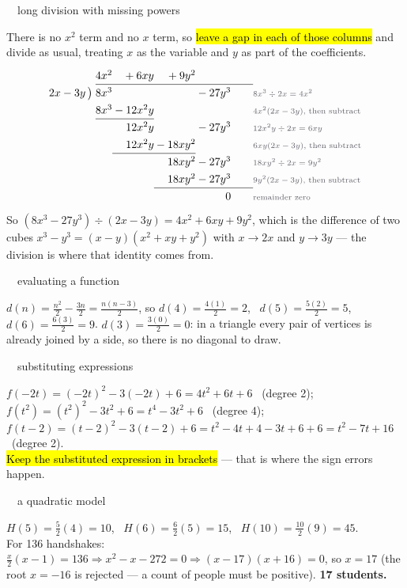 \documentclass[11pt]{article}
\newcommand{\key}[1]{\hl{#1}}
\newcommand{\solhead}[2]{\medskip{\color{lilacdeep}\bfseries Q#1.}\ \ {\color{greyish}\footnotesize #2}\par\nobreak}
\newcommand{\dstep}[1]{\text{\normalfont\scriptsize\color{greyish}#1}}
\begin{document}
\solhead{5}{long division with missing powers}
There is no $x^{2}$ term and no $x$ term, so \key{leave a gap in each of those columns} and divide as usual, treating $x$ as the variable and $y$ as part of the coefficients.
\[\renewcommand{\arraystretch}{1.3}\setlength{\arraycolsep}{0.17em}
\begin{array}{r@{\;}r@{}r@{}r@{}r@{\qquad}l}
              & 4x^{2} & {}+6xy      & {}+9y^{2}   &            & \\ \cline{2-5}
 2x-3y\,\big) & 8x^{3} &             &             & {}-27y^{3} & \dstep{$8x^{3}\div 2x=4x^{2}$}\\
              & 8x^{3} & {}-12x^{2}y &             &            & \dstep{$4x^{2}(2x-3y)$, then subtract}\\ \cline{2-3}
              &        & 12x^{2}y    &             & {}-27y^{3} & \dstep{$12x^{2}y\div 2x=6xy$}\\
              &        & 12x^{2}y    & {}-18xy^{2} &            & \dstep{$6xy(2x-3y)$, then subtract}\\ \cline{3-4}
              &        &             & 18xy^{2}    & {}-27y^{3} & \dstep{$18xy^{2}\div 2x=9y^{2}$}\\
              &        &             & 18xy^{2}    & {}-27y^{3} & \dstep{$9y^{2}(2x-3y)$, then subtract}\\ \cline{4-5}
              &        &             &             & 0          & \dstep{remainder zero}
\end{array}\]
So $(8x^{3}-27y^{3})\div(2x-3y)=4x^{2}+6xy+9y^{2}$, which is the difference of two cubes
$x^{3}-y^{3}=(x-y)(x^{2}+xy+y^{2})$ with $x\to2x$ and $y\to3y$ --- the division is where that identity comes from.

\solhead{6}{evaluating a function}
$d(n)=\frac{n^{2}}{2}-\frac{3n}{2}=\frac{n(n-3)}{2}$, so
$d(4)=\frac{4(1)}{2}=2$, \ $d(5)=\frac{5(2)}{2}=5$, \ $d(6)=\frac{6(3)}{2}=9$.
$d(3)=\frac{3(0)}{2}=0$: in a triangle every pair of vertices is already joined by a side, so there is no diagonal to draw.

\solhead{7}{substituting expressions}
$f(-2t)=(-2t)^{2}-3(-2t)+6=4t^{2}+6t+6$ \ (degree 2);\\
$f(t^{2})=(t^{2})^{2}-3t^{2}+6=t^{4}-3t^{2}+6$ \ (degree 4);\\
$f(t-2)=(t-2)^{2}-3(t-2)+6=t^{2}-4t+4-3t+6+6=t^{2}-7t+16$ \ (degree 2).\\
\key{Keep the substituted expression in brackets} --- that is where the sign errors happen.

\solhead{8}{a quadratic model}
$H(5)=\frac52(4)=10$, \ $H(6)=\frac62(5)=15$, \ $H(10)=\frac{10}{2}(9)=45$.\\
For 136 handshakes: $\frac x2(x-1)=136\Rightarrow x^{2}-x-272=0\Rightarrow(x-17)(x+16)=0$, so $x=17$ (the root $x=-16$ is rejected --- a count of people must be positive). \textbf{17 students.}
\end{document}
